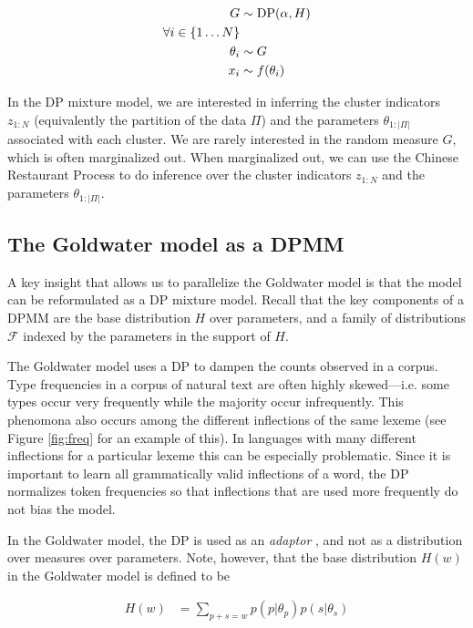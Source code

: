 \begin{align}
  G &\sim \mathrm{DP}(\alpha, H) \\
  \forall i \in \{1 \ldots N\}& \\
  \theta_i &\sim G \\
  x_i &\sim f(\theta_i)
\end{align}

In the DP mixture model, we are interested in inferring the cluster
indicators $z_{1:N}$ (equivalently the partition of the data $\Pi$) and
the parameters $\theta_{1:|\Pi|}$ associated with each cluster. We are
rarely interested in the random measure $G$, which is often
marginalized out. When marginalized out, we can use the Chinese
Restaurant Process to do inference over the cluster indicators $z_{1:N}$
and the parameters $\theta_{1:|\Pi|}$.

\subsection{The Goldwater model as a DPMM}

A key insight that allows us to parallelize the Goldwater model is
that the model can be reformulated as a DP mixture model. Recall that
the key components of a DPMM are the base distribution $H$ over
parameters, and a family of distributions $\mathcal{F}$ indexed by the
parameters in the support of $H$.

The Goldwater model uses a DP to dampen the counts observed in a
corpus. Type frequencies in a corpus of natural text are often highly
skewed---i.e. some types occur very frequently while the majority
occur infrequently. This phenomona also occurs among the different
inflections of the same lexeme (see Figure \ref{fig:freq} for an
example of this). In languages with many different inflections for a
particular lexeme this can be especially problematic. Since it is
important to learn all grammatically valid inflections of a word, the
DP normalizes token frequencies so that inflections that are used more
frequently do not bias the model.

In the Goldwater model, the DP is used as an \textit{adaptor}
\cite{goldwater2011}, and not as a distribution over measures over
parameters. Note, however, that the base distribution $H(w)$ in the
Goldwater model is defined to be

\begin{align*}
  H(w) &= \sum_{p + s = w} p(p | \theta_p) p(s | \theta_s)
\end{align*}

